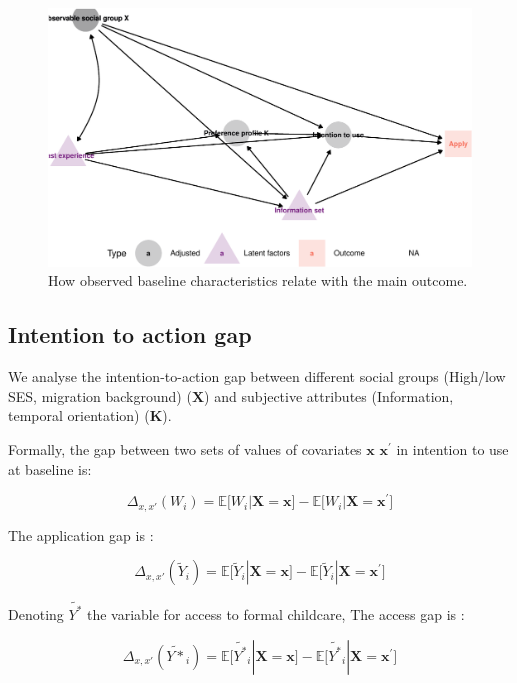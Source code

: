 \documentclass[
]{article}
\newcommand{\espb}[1]{\mathds{E}\Big[ #1 \Big]}
\begin{document}
\begin{figure}
\centering
\includegraphics{FormalStuff_files/figure-latex/DagIntention-1.pdf}
\caption{\label{fig:DagIntention}How observed baseline characteristics relate with the main outcome.}
\end{figure}

\subsection{Intention to action gap}\label{intention-to-action-gap}

We analyse the intention-to-action gap between different social groups (High/low SES, migration background) (\(\mathbf{X}\)) and subjective attributes (Information, temporal orientation) (\(\mathbf{K}\)).

Formally, the gap between two sets of values of covariates \(\mathbf{x}\) \(\mathbf{x^\prime}\) in intention to use at baseline is:

\begin{equation}
\Delta_{x,x'}(W_i) = \espb{W_i|\mathbf{X}=\mathbf{x}}-\espb{W_i|\mathbf{X}=\mathbf{x^\prime}}
\end{equation}

The application gap is :

\begin{equation}
\Delta_{x,x'}(\tilde{Y}_i) = \espb{\tilde{Y}_i|\mathbf{X}=\mathbf{x}}-\espb{\tilde{Y}_i|\mathbf{X}=\mathbf{x^\prime}}
\end{equation}

Denoting \(\tilde{Y^*}\) the variable for access to formal childcare, The access gap is :

\begin{equation}
\Delta_{x,x'}(\tilde{Y*}_i) = \espb{\tilde{Y^*}_i|\mathbf{X}=\mathbf{x}}-\espb{\tilde{Y^*}_i|\mathbf{X}=\mathbf{x^\prime}}
\end{equation}
\end{document}
